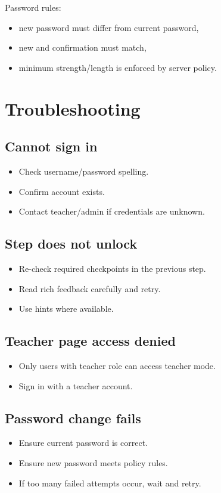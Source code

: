 \documentclass[11pt,a4paper]{article}
\begin{document}
Password rules:
\begin{itemize}
  \item new password must differ from current password,
  \item new and confirmation must match,
  \item minimum strength/length is enforced by server policy.
\end{itemize}

\section{Troubleshooting}
\subsection{Cannot sign in}
\begin{itemize}
  \item Check username/password spelling.
  \item Confirm account exists.
  \item Contact teacher/admin if credentials are unknown.
\end{itemize}

\subsection{Step does not unlock}
\begin{itemize}
  \item Re-check required checkpoints in the previous step.
  \item Read rich feedback carefully and retry.
  \item Use hints where available.
\end{itemize}

\subsection{Teacher page access denied}
\begin{itemize}
  \item Only users with teacher role can access teacher mode.
  \item Sign in with a teacher account.
\end{itemize}

\subsection{Password change fails}
\begin{itemize}
  \item Ensure current password is correct.
  \item Ensure new password meets policy rules.
  \item If too many failed attempts occur, wait and retry.
\end{itemize}
\end{document}
